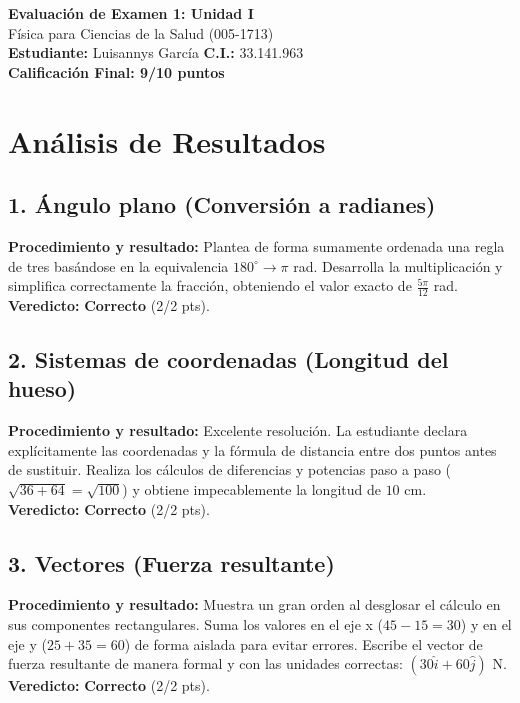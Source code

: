 \documentclass[12pt]{article}
\begin{document}
\begin{center}
    \Large \textbf{Evaluación de Examen 1: Unidad I} \\
    \large Física para Ciencias de la Salud (005-1713) \\
    \vspace{0.5cm}
    \textbf{Estudiante:} Luisannys García \quad \textbf{C.I.:} 33.141.963
    \vspace{0.3cm} \\
    \large \textbf{Calificación Final: 9/10 puntos}
\end{center}

\vspace{0.5cm}

\section*{Análisis de Resultados}

\subsection*{1. Ángulo plano (Conversión a radianes)}
\textbf{Procedimiento y resultado:} Plantea de forma sumamente ordenada una regla de tres basándose en la equivalencia $180^\circ \rightarrow \pi$ rad. Desarrolla la multiplicación y simplifica correctamente la fracción, obteniendo el valor exacto de $\frac{5\pi}{12}$ rad. \\
\textbf{Veredicto:} \textbf{Correcto} (2/2 pts).

\subsection*{2. Sistemas de coordenadas (Longitud del hueso)}
\textbf{Procedimiento y resultado:} Excelente resolución. La estudiante declara explícitamente las coordenadas y la fórmula de distancia entre dos puntos antes de sustituir. Realiza los cálculos de diferencias y potencias paso a paso ($\sqrt{36+64} = \sqrt{100}$) y obtiene impecablemente la longitud de $10$ cm. \\
\textbf{Veredicto:} \textbf{Correcto} (2/2 pts).

\subsection*{3. Vectores (Fuerza resultante)}
\textbf{Procedimiento y resultado:} Muestra un gran orden al desglosar el cálculo en sus componentes rectangulares. Suma los valores en el eje x ($45 - 15 = 30$) y en el eje y ($25 + 35 = 60$) de forma aislada para evitar errores. Escribe el vector de fuerza resultante de manera formal y con las unidades correctas: $(30\hat{i} + 60\hat{j})$ N. \\
\textbf{Veredicto:} \textbf{Correcto} (2/2 pts).
\end{document}
